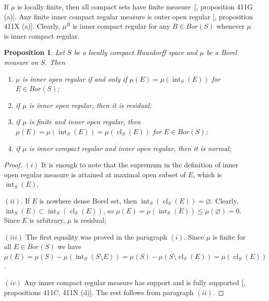\documentclass[12pt]{article}
\newtheorem{proposition}[theorem]{Proposition}
\begin{document}
If $\mu$ is locally finite, then all compact sets have finite
measure~[\cite{FremMeasTh4.1}, proposition 411G (a)]. Any finite inner compact
regular measure is outer open regular [\cite{FremMeasTh4.1}, proposition 411X
        (a)]. Clearly, $\mu^B$ is inner compact regular for any $B\in Bor(S)$ whenever
$\mu$ is inner compact regular.

\begin{proposition}\label{InnerOpenRegMeasCharac} Let $S$ be a locally compact
    Hausdorff space and $\mu$ be a Borel measure on $S$. Then
    \begin{enumerate}[label = (\roman*)]
        \item $\mu$ is inner open regular if and only if
              $\mu(E)=\mu(\operatorname{int}_S(E))$ for $E\in Bor(S)$;

        \item if $\mu$ is inner open regular, then it is residual;

        \item if $\mu$ is finite and inner open regular, then
              $\mu(E)=\mu(\operatorname{int}_S(E))=\mu(\operatorname{cl}_S(E))$
              for $E\in Bor(S)$;

        \item if $\mu$ is inner compact regular and inner open regular,
              then it is normal;
    \end{enumerate}
\end{proposition}
\begin{proof} $(i)$ It is enough to note that the supremum in the definition of
    inner open regular measure is attained at maximal open subset of $E$, which
    is $\operatorname{int}_S(E)$.

    $(ii)$. If $E$ is nowhere dense Borel set, 
    then $\operatorname{int}_S(\operatorname{cl}_S(E))=\varnothing$. 
    Clearly, $\operatorname{int}_S(E)
        \subset\operatorname{int}_S(\operatorname{cl}_S(E))$, 
    so $\mu(E)=\mu(\operatorname{int}_S(E))\leq\mu(\varnothing)=0$. Since $E$ 
    is arbitrary, $\mu$ is residual;

    $(iii)$ The first equality was proved in the paragraph $(i)$. Since $\mu$
    is finite for all $E\in Bor(S)$ we have
    $\mu(E)=\mu(S)-\mu(\operatorname{int}_S(S\setminus E))=\mu(S)-\mu(S\setminus
        \operatorname{cl}_S(E))=\mu(\operatorname{cl}_S(E))$. 

    $(iv)$ Any inner compact regular measure has support and is fully supported
        [\cite{FremMeasTh4.1}, propositions 411C, 411N (d)]. The rest follows
    from paragraph $(ii)$.
\end{proof}
\end{document}
